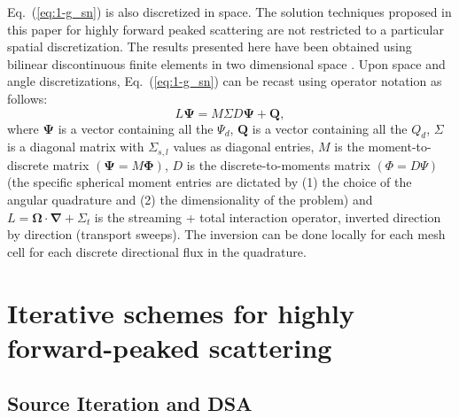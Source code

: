 \documentclass[preprint,10pt]{elsarticle}
\newcommand\bn{\boldsymbol{\nabla}}
\newcommand\bo{\boldsymbol{\Omega}}
\newcommand\bs{\boldsymbol}
\renewcommand{\(}{\left(}
\renewcommand{\)}{\right)}
\renewcommand{\[}{\left[}
\renewcommand{\]}{\right]}
\newcommand{\eqt}[1]{Eq.~(\ref{#1})}                     %
\begin{document}
\eqt{eq:1-g_sn} is also discretized in space. The solution techniques proposed
in this paper for highly forward peaked scattering are not restricted to a 
particular spatial discretization. The results presented here have been obtained 
using bilinear discontinuous finite elements in two dimensional space \cite{dgfem}.
Upon space and angle discretizations, \eqt{eq:1-g_sn} can be recast using operator notation as follows:
%
\begin{equation}
L \bs{\Psi} = M\Sigma D \bs{\Psi} + \bs{Q},
\label{eq:operator}
\end{equation}
%
where $\bs{\Psi}$ is a vector containing all the $\Psi_d$, $\bs{Q}$ is a
vector containing all the $Q_d$, $\Sigma$ is a diagonal matrix with 
$\Sigma_{s,l}$ values as diagonal entries, $M$ is the moment-to-discrete
matrix $(\bs{\Psi} = M\bs{\Phi})$, $D$ is the discrete-to-moments matrix
$(\Phi=D\Psi)$ (the specific spherical moment entries are dictated by (1) the choice of 
the angular quadrature and (2) the dimensionality of the problem) and 
$L = \bo\cdot\bn + \Sigma_t$ is the streaming + total interaction operator,
inverted direction by direction (transport sweeps). The inversion can be done
locally for each mesh cell for each discrete directional flux in the
quadrature.\\

\section{Iterative schemes for highly forward-peaked scattering} \label{sec:iterative_scheme}

\subsection{Source Iteration and DSA}
\end{document}
